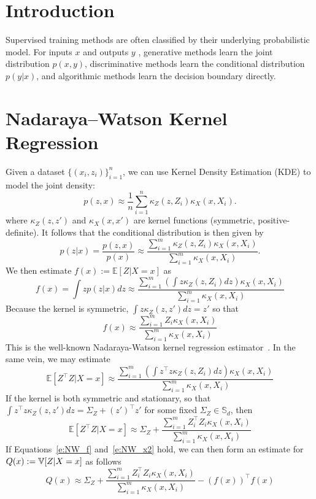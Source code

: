 
\section{Introduction}
Supervised training methods are often classified by their underlying probabilistic model.  For inputs $x$ and outputs $y$ , generative methods learn the joint distribution $p(x,y)$, discriminative methods learn the conditional distribution $p(y|x)$, and algorithmic methods learn the decision boundary directly.  

\section{Nadaraya--Watson Kernel Regression} 
Given a dataset $\{(x_i,z_i)\}_{i=1}^n$, we can use Kernel Density Estimation (KDE) to model the joint density:
\[
p(z,x) \approx \frac{1}{n} \sum_{i=1}^n \kappa_Z(z,Z_i)\kappa_X(x,X_i).
\]
where  $\kappa_Z(z,z')$ and $\kappa_X(x,x')$ are kernel functions (symmetric, positive-definite).  It follows that the conditional distribution is then given by
\begin{equation} \label{e:kde_condl}
p(z|x) 
= \frac{p(z,x)}{p(x)} 
\approx \frac{\sum_{i=1}^m \kappa_Z(z,Z_i)\kappa_X(x,X_i)}{ \sum_{i=1}^m \kappa_X(x,X_i)}.
\end{equation}
We then estimate $f(x):=\mathbb{E}[Z|X=x]$ as
\begin{equation}
  f(x) = \int z p(z|x) dz \approx  \frac{\sum_{i=1}^m \left(\int z \kappa_Z(z,Z_i) dz\right) \kappa_X(x,X_i)}{ \sum_{i=1}^m \kappa_X(x,X_i)}  
\end{equation}
Because the kernel is symmetric, $\int z \kappa_Z(z,z') dz = z'$ so that 
\begin{equation} \label{e:NW_f}
f(x) \approx  \frac{\sum_{i=1}^m Z_i \kappa_X(x,X_i)}{ \sum_{i=1}^m \kappa_X(x,X_i)}
\end{equation}
This is the well-known Nadaraya-Watson kernel regression estimator~\cite{Nad64, Wat64}.  In the same vein, we may estimate
\begin{equation}
    \mathbb{E}[Z^\intercal Z|X=x]\approx  \frac{\sum_{i=1}^m \left(\int z^\intercal z \kappa_Z(z,Z_i) dz\right) \kappa_X(x,X_i)}{ \sum_{i=1}^m \kappa_X(x,X_i)}
\end{equation}
If the kernel is both symmetric and stationary, so that $\int z^\intercal z \kappa_Z(z,z') dz = \Sigma_Z + (z')^\intercal z'$ for some fixed $\Sigma_Z\in \mathbb{S}_d$, then
\begin{equation} \label{e:NW_x2}
\mathbb{E}[Z^\intercal Z|X=x]\approx  \Sigma_Z + \frac{\sum_{i=1}^m Z_i^\intercal Z_i \kappa_X(x,X_i)}{ \sum_{i=1}^m \kappa_X(x,X_i)}
\end{equation}
If Equations~\ref{e:NW_f} and~\ref{e:NW_x2} hold, we can then form an estimate for $Q(x):=\operatorname{\mathbb{V}}[ Z|X=x]$ as follows
\begin{equation} \label{e:NW_Q}
Q(x) \approx \Sigma_Z + \frac{\sum_{i=1}^m Z_i^\intercal Z_i \kappa_X(x,X_i)}{ \sum_{i=1}^m \kappa_X(x,X_i)} - (f(x))^\intercal f(x)
\end{equation}

